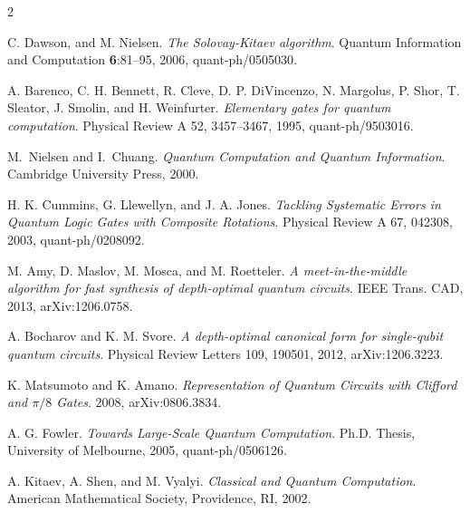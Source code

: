 \documentclass[english,journal]{extarticle}
\theoremstyle{plain}
\theoremstyle{plain}
\theoremstyle{plain}
\theoremstyle{definition}
\theoremstyle{plain}
\theoremstyle{plain}
\begin{document}
\begin{thebibliography}{2}

 C. Dawson, and M. Nielsen. \emph{The Solovay-Kitaev
algorithm}. Quantum Information and Computation {\bf 6}:81--95, 2006,
{quant-ph/0505030}.

 A. Barenco, C. H. Bennett, R. Cleve, D. P. DiVincenzo, N.
Margolus, P. Shor, T. Sleator, J. Smolin, and H. Weinfurter. \emph{Elementary
gates for quantum computation}.  Physical Review A 52, 3457–3467, 1995, 
{quant-ph/9503016}.

 M.~Nielsen and I.~Chuang. {\em Quantum Computation and Quantum
Information}. Cambridge University Press, 2000.

 H. K. Cummins, G. Llewellyn, and J. A. Jones. \emph{Tackling
Systematic Errors in Quantum Logic Gates with Composite Rotations}.  Physical
Review A 67, 042308, 2003,
{quant-ph/0208092}.

 M. Amy, D. Maslov, M. Mosca, and M. Roetteler. \emph{A
meet-in-the-middle algorithm for fast synthesis of depth-optimal quantum
circuits}. IEEE Trans. CAD, 2013,
{arXiv:1206.0758}.

 A. Bocharov and K. M. Svore. \emph{A depth-optimal canonical form
for single-qubit quantum circuits}. Physical Review Letters 109, 190501, 2012,
{arXiv:1206.3223}.


 K. Matsumoto and K. Amano. \emph{Representation of Quantum Circuits
with Clifford and $\pi/8$ Gates}. 2008,
{arXiv:0806.3834}.

 A. G. Fowler. {\em Towards Large-Scale Quantum Computation}.
Ph.D. Thesis, University of Melbourne, 2005,
{quant-ph/0506126}.

 A. Kitaev, A. Shen, and M. Vyalyi. \emph{Classical and Quantum
Computation}. American Mathematical Society, Providence, RI, 2002.


\end{thebibliography}
\end{document}
